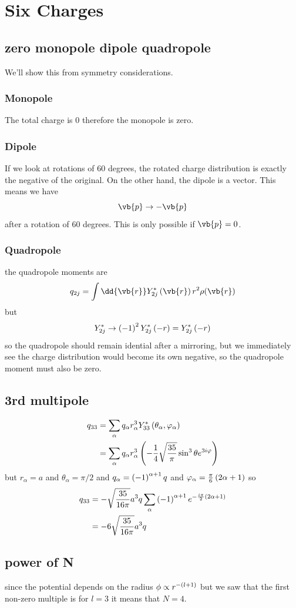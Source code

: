 \clearpage
\section{Six Charges}
\subsection{zero monopole dipole quadropole}
We'll show this from symmetry considerations.
\subsubsection{Monopole}
The total charge is 0 therefore the monopole is zero. 
\subsubsection{Dipole}
If we look at rotations of \(60\) degrees, the rotated charge distribution is exactly the negative of the original. On the other hand, the dipole is a vector. This means we have
\begin{equation}
    \vb{p}\to-\vb{p}
\end{equation}
after a rotation of 60 degrees. This is only possible if \(\vb{p}=0\).
\subsubsection{Quadropole}
the quadropole moments are 
\begin{equation}
    q_{2j}=\int\dd{\vb{r}}Y^*_{2j}\ins{\vb{r}}r^2\rho(\vb{r})
\end{equation}
but 
\begin{equation}
    Y^*_{2j}\to\left(-1\right)^2Y^*_{2j}\left(-r\right)=Y^*_{2j}\left(-r\right)
\end{equation}
so the quadropole should remain idential after a mirroring, but we immediately see the charge distribution would become its own negative, so the quadropole moment must also be zero.
\subsection{3rd multipole}
\begin{align}
    q_{33}&=\sum_{\alpha}q_\alpha r_\alpha^3 Y^*_{33}\left(\theta_\alpha,\varphi_\alpha\right)\\
    &=\sum_{\alpha}q_\alpha r_\alpha^3 \left(-\frac{1}{4}\sqrt{\frac{35}{\pi}}\sin^3\theta e^{3i\varphi}\right)
\end{align}
but \(r_\alpha=a\) and \(\theta_\alpha=\pi/2\) and \(q_\alpha=\left(-1\right)^{\alpha+1}q\) and \(\varphi_\alpha=\frac{\pi}{6}\left(2\alpha+1\right)\) so 
\begin{align}
    q_{33}&=-\sqrt{\frac{35}{16\pi}}a^3q\sum_\alpha\left(-1\right)^{\alpha+1}e^{-\frac{i\pi}{2}\left(2\alpha+1\right)}\\
    &=-6\sqrt{\frac{35}{16\pi}}a^3 q
\end{align}
\subsection{power of N}
since the potential depends on the radius \(\phi\propto r^{-\left(l+1\right)}\) but we saw that the first non-zero multiple is for \(l=3\) it means that \(N=4\).